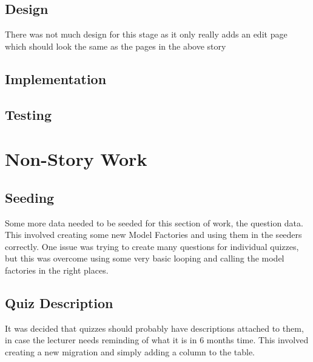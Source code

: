 \documentclass{article}
\begin{document}
\subsection{Design}
There was not much design for this stage as it only really adds an edit page which should look the same as the pages in the above story
\subsection{Implementation}
\subsection{Testing}
\newpage

\section{Non-Story Work}
\subsection{Seeding}
Some more data needed to be seeded for this section of work, the question data. This involved creating some new Model Factories and using them in the seeders correctly. One issue was trying to create many questions for individual quizzes, but this was overcome using some very basic looping and calling the model factories in the right places.
\subsection{Quiz Description}
It was decided that quizzes should probably have descriptions attached to them, in case the lecturer needs reminding of what it is in 6 months time. This involved creating a new migration and simply adding a column to the table.

%
%
\end{document}
